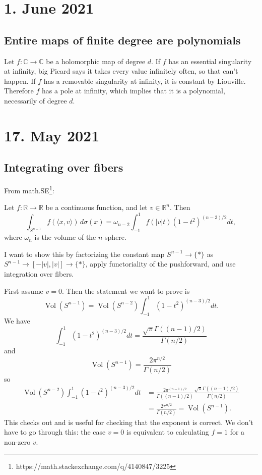 \documentclass[11pt]{article}
\theoremstyle{definition}
\newcommand{\kk}[1]{\mathbb{#1}}
\DeclareMathOperator{\Vol}{Vol}
\begin{document}
\section*{1. June 2021}

\subsection*{Entire maps of finite degree are polynomials}

Let $f : \kk C \to \kk C$ be a holomorphic map of degree $d$. If $f$ has an essential singularity at infinity, big Picard says it takes every value infinitely often, so that can't happen. If $f$ has a removable singularity at infinity, it is constant by Liouville. Therefore $f$ has a pole at infinity, which implies that it is a polynomial, necessarily of degree $d$.




\section*{17. May 2021}
\subsection*{Integrating over fibers}

From math.SE\footnote{https://math.stackexchange.com/q/4140847/3225}:

Let $f : \kk R \to \kk R$ be a continuous function, and let $v \in \kk R^n$. Then
\[
\int_{S^{n-1}} f(\langle x, v \rangle) \, d\sigma(x)
= \omega_{n-2}\int_{-1}^1 f(|v| t) (1-t^2)^{(n-3)/2} dt,
\]
where $\omega_n$ is the volume of the $n$-sphere.


I want to show this by factorizing the constant map $S^{n-1} \to \{*\}$ as $S^{n-1} \to [-|v|, |v|] \to \{*\}$, apply functoriality of the pushforward, and use integration over fibers.

First assume $v = 0$. Then the statement we want to prove is
\[
\Vol(S^{n-1}) = \Vol(S^{n-2}) \int_{-1}^1 (1-t^2)^{(n-3)/2} dt.
\]
We have
\[
\int_{-1}^1 (1-t^2)^{(n-3)/2} dt
= \frac{\sqrt \pi \Gamma((n-1)/2)}{\Gamma(n/2)}
\]
and
\[
\Vol(S^{n-1}) = \frac{2 \pi^{n/2}}{\Gamma(n/2)}
\]
so
\begin{align*}
\Vol(S^{n-2})
\int_{-1}^1 (1-t^2)^{(n-3)/2} dt
&= \frac{2 \pi^{(n-1)/2}}{\Gamma((n-1)/2)}
\frac{\sqrt \pi \Gamma((n-1)/2)}{\Gamma(n/2)}
\\
&= \frac{2\pi^{n/2}}{\Gamma(n/2)}
= \Vol(S^{n-1}).
\end{align*}
This checks out and is useful for checking that the exponent is correct. We don't have to go through this: the case $v = 0$ is equivalent to calculating $f = 1$ for a non-zero $v$.
\end{document}
